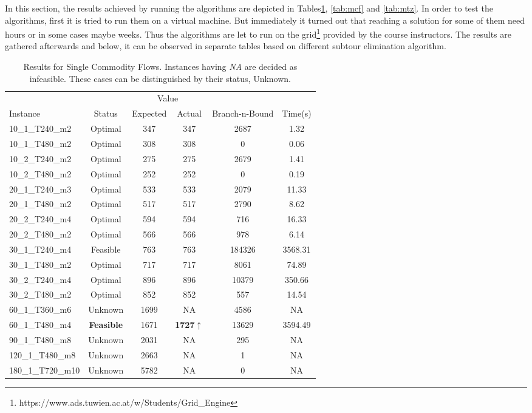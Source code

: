 In this section, the results achieved by running the algorithms are depicted in
Tables\ref{tab:scf}, \ref{tab:mcf} and \ref{tab:mtz}.
In order to test the algorithms, first it is tried to run them on a virtual
machine. But immediately it turned out that reaching a solution for some of them
need hours or in some cases maybe weeks. Thus the algorithms are let to run
on the grid\footnote{https://www.ads.tuwien.ac.at/w/Students/Grid\_Engine}
provided by the course instructors. The results are gathered afterwards and
below, it can be observed in separate tables based on different subtour
elimination algorithm.

\begin{center}

\begin{table}[H]
    \begin{tabular}{ l c c c c c }
    \hline
    &&\multicolumn{2}{c}{Value} && \\
    \cmidrule(r){3-4}
    Instance & Status & Expected & Actual & Branch-n-Bound & Time(s) \\ \hline
    10\_1\_T240\_m2 & Optimal & 347& 347  & 2687 & 1.32 \\ 
	10\_1\_T480\_m2 & Optimal & 308& 308  & 0 & 0.06 \\ 
	10\_2\_T240\_m2 & Optimal & 275& 275  & 2679 & 1.41 \\ 
	10\_2\_T480\_m2 & Optimal & 252& 252  & 0 & 0.19 \\ 
	20\_1\_T240\_m3 & Optimal & 533& 533  & 2079 & 11.33 \\ 
	20\_1\_T480\_m2 & Optimal & 517& 517  & 2790 & 8.62 \\ 
	20\_2\_T240\_m4 & Optimal & 594& 594  & 716 & 16.33 \\ 
	20\_2\_T480\_m2 & Optimal & 566& 566  & 978 & 6.14 \\ 
	30\_1\_T240\_m4 & Feasible & 763& 763  & 184326 & 3568.31 \\ 
	30\_1\_T480\_m2 & Optimal & 717& 717  & 8061 & 74.89 \\ 
	30\_2\_T240\_m4 & Optimal & 896& 896  & 10379 & 350.66 \\ 
	30\_2\_T480\_m2 & Optimal & 852& 852  & 557 & 14.54 \\ 
	60\_1\_T360\_m6 & Unknown & 1699& NA &  4586 & NA \\ 
	60\_1\_T480\_m4 & {\bf Feasible} & 1671& {\bf 1727}$\uparrow$  & 13629 &
	3594.49
	\\
	90\_1\_T480\_m8 & Unknown & 2031& NA &  295 & NA \\ 
	120\_1\_T480\_m8 & Unknown & 2663& NA & 1 & NA \\ 
	180\_1\_T720\_m10 & Unknown & 5782& NA & 0 & NA \\
    \hline
    \end{tabular}
    \caption{\label{tab:scf} Results for Single Commodity Flows. Instances
    having {\it NA} are decided as infeasible. These cases can be
    distinguished by their status, Unknown.
    }
\end{table}


\end{center}
